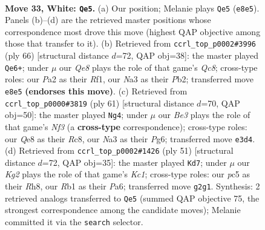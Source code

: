 \documentclass[11pt]{article}
\begin{document}
\clearpage

\begin{figure}[p]\centering
\begin{subfigure}{0.46\textwidth}\centering
\resizebox{\linewidth}{!}{%
\newchessgame
\chessboard[
  setfen={4Q1nr/1kr3p1/8/2p3Pp/2P2P1q/N3B3/PP4K1/1R6 w - - 3 33},
  showmover=false,
  pgfstyle=straightmove, color=movearrow, markmove={e8-e5}
]}
\caption{}
\end{subfigure}\hfill
\begin{subfigure}{0.46\textwidth}\centering
\resizebox{\linewidth}{!}{%
\newchessgame
\chessboard[
  setfen={2Qbk1rr/1p6/p6p/2pPp3/4P1P1/4q2P/PP6/5R1K w - - 9 34},
  showmover=false,
  pgfstyle=straightmove, color=movearrow, markmove={c8-e6}
]}
\caption{}
\end{subfigure}
\\[4pt]
\begin{subfigure}{0.46\textwidth}\centering
\resizebox{\linewidth}{!}{%
\newchessgame
\chessboard[
  setfen={N1r3k1/4pp1p/p4np1/Q7/1P6/3RPq2/5P1P/3R2K1 b - - 0 31},
  showmover=false,
  pgfstyle=straightmove, color=movearrow, markmove={f6-g4}
]}
\caption{}
\end{subfigure}\hfill
\begin{subfigure}{0.46\textwidth}\centering
\resizebox{\linewidth}{!}{%
\newchessgame
\chessboard[
  setfen={2k4r/5p2/p3pP2/3rn1B1/1qp5/6P1/1PR1Q2P/5RK1 b - - 1 26},
  showmover=false,
  pgfstyle=straightmove, color=movearrow, markmove={c8-d7}
]}
\caption{}
\end{subfigure}
\caption{\textbf{Move 33, White: \texttt{Qe5}.} (a) Our position; Melanie plays \texttt{Qe5} (\texttt{e8e5}). Panels (b)--(d) are the retrieved master positions whose correspondence most drove this move (highest QAP objective among those that transfer to it). (b) Retrieved from \texttt{ccrl\_top\_p0002\#3996} (ply 66) [structural distance $d$=72, QAP obj=38]: the master played \texttt{Qe6+}; under $\mu$ our \emph{Qe8} plays the role of that game's \emph{Qc8}; cross-type roles: our \emph{P}a2 as their \emph{R}f1, our \emph{N}a3 as their \emph{P}b2; transferred move \texttt{e8e5} \textbf{(endorses this move)}. (c) Retrieved from \texttt{ccrl\_top\_p0000\#3819} (ply 61) [structural distance $d$=70, QAP obj=50]: the master played \texttt{Ng4}; under $\mu$ our \emph{Be3} plays the role of that game's \emph{Nf3} (a \textbf{cross-type} correspondence); cross-type roles: our \emph{Q}e8 as their \emph{R}c8, our \emph{N}a3 as their \emph{P}g6; transferred move \texttt{e3d4}. (d) Retrieved from \texttt{ccrl\_top\_p0002\#1426} (ply 51) [structural distance $d$=72, QAP obj=35]: the master played \texttt{Kd7}; under $\mu$ our \emph{Kg2} plays the role of that game's \emph{Kc1}; cross-type roles: our \emph{p}c5 as their \emph{R}h8, our \emph{R}b1 as their \emph{P}a6; transferred move \texttt{g2g1}. Synthesis: 2 retrieved analogs transferred to \texttt{Qe5} (summed QAP objective 75, the strongest correspondence among the candidate moves); Melanie committed it via the \texttt{search} selector.}
\label{fig:thought-m64}
\end{figure}
\end{document}
